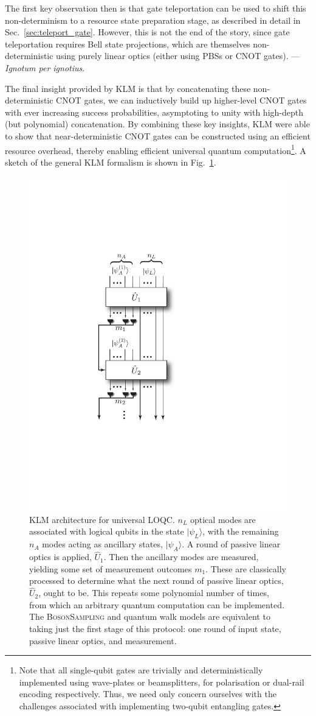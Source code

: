 \documentclass[aps, rmp, twocolumn, amsmath, amssymb, nofootinbib, superscriptaddress, longbibliography, floatfix, table-of-contents, eqsecnum]{revtex4-1}
\newcommand{\ket}[1]{|#1\rangle}
\begin{document}
The first key observation then is that gate teleportation can be used to shift this non-determinism to a resource state preparation stage, as described in detail in Sec.~\ref{sec:teleport_gate}. However, this is not the end of the story, since gate teleportation requires Bell state projections, which are themselves non-deterministic using purely linear optics (either using PBSs or CNOT gates). --- \textit{Ignotum per ignotius}.

The final insight provided by KLM is that by concatenating these non-deterministic CNOT gates, we can inductively build up higher-level CNOT gates with ever increasing success probabilities, asymptoting to unity with high-depth (but polynomial) concatenation. By combining these key insights, KLM were able to show that near-deterministic CNOT gates can be constructed using an efficient resource overhead, thereby enabling efficient universal quantum computation\footnote{Note that all single-qubit gates are trivially and deterministically implemented using wave-plates or beamsplitters, for polarisation or dual-rail encoding respectively. Thus, we need only concern ourselves with the challenges associated with implementing two-qubit entangling gates.}. A sketch of the general KLM formalism is shown in Fig.~\ref{fig:KLM_protocol}.

\begin{figure}[!htb]
\includegraphics[width=0.5\columnwidth]{KLM}
\caption{KLM architecture for universal LOQC. $n_L$ optical modes are associated with logical qubits in the state $\ket{\psi_L}$, with the remaining $n_A$ modes acting as ancillary states, $\ket{\psi_A}$. A round of passive linear optics is applied, $\hat{U}_1$. Then the ancillary modes are measured, yielding some set of measurement outcomes $m_1$. These are classically processed to determine what the next round of passive linear optics, $\hat{U}_2$, ought to be. This repeats some polynomial number of times, from which an arbitrary quantum computation can be implemented. The \textsc{BosonSampling} and quantum walk models are equivalent to taking just the first stage of this protocol: one round of input state, passive linear optics, and measurement.} \label{fig:KLM_protocol}
\end{figure}
\end{document}
